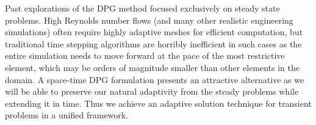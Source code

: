 \documentclass[letterpaper,12pt]{article}
\begin{document}
Past explorations of the DPG method focused exclusively on steady state problems.
High Reynolds number flows (and many other realistic engineering simulations) often require highly adaptive meshes for efficient computation,
but traditional time stepping algorithms are horribly inefficient in such cases as the entire simulation needs to move forward 
at the pace of the most restrictive element, which may be orders of magnitude smaller than other elements in the domain.
A space-time DPG formulation presents an attractive alternative as we will be able to preserve our natural adaptivity 
from the steady problems while extending it in time.
Thus we achieve an adaptive solution technique for transient problems in a unified framework.
\end{document}
